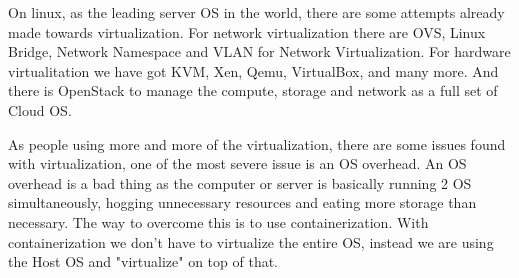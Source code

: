 \documentclass[12pt, a4paper]{article}
\begin{document}
On linux, as the leading server OS in the world, there are some attempts already made towards virtualization. For network virtualization there are OVS, Linux Bridge, Network Namespace and VLAN for Network Virtualization. For hardware virtualitation we have got KVM, Xen, Qemu, VirtualBox, and many more. And there is OpenStack to manage the compute, storage and network as a full set of Cloud OS.

As people using more and more of the virtualization, there are some issues found with virtualization, one of the most severe issue is an OS overhead. An OS overhead is a bad thing as the computer or server is basically running 2 OS simultaneously, hogging unnecessary resources and eating more storage than necessary. The way to overcome this is to use containerization. With containerization we don't have to virtualize the entire OS, instead we are using the Host OS and "virtualize" on top of that.
\end{document}
